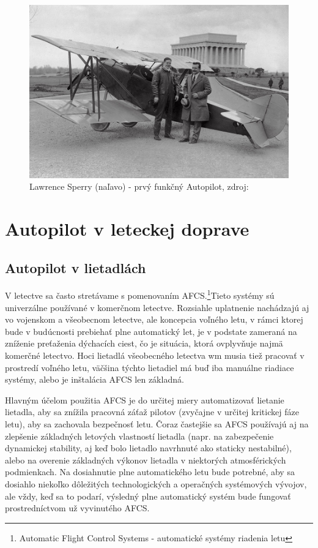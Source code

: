 \documentclass[10pt,twoside,slovak,a4paper]{article}
\begin{document}
\begin{figure}[tbh]
\centering
\includegraphics[scale=0.27]{obr2.jpg}
\caption{Lawrence Sperry (naľavo) - prvý funkčný Autopilot, zdroj:\cite{Sperry}}
\label{f:obr2}
\end{figure}

\section{Autopilot v leteckej doprave} \label{AVL}

\subsection{Autopilot v lietadlách}
V letectve sa často stretávame s pomenovaním AFCS.\footnote{Automatic Flight Control Systems - automatické systémy riadenia letu}Tieto systémy sú univerzálne používané v komerčnom letectve. Rozsiahle uplatnenie nachádzajú aj vo vojenskom a všeobecnom letectve, ale koncepcia voľného letu, v rámci ktorej bude v budúcnosti prebiehať plne automatický let, je v podstate zameraná na zníženie preťaženia dýchacích ciest, čo je situácia, ktorá ovplyvňuje najmä komerčné letectvo. Hoci lietadlá všeobecného letectva wm musia tiež pracovať v prostredí voľného letu, väčšina týchto lietadiel má buď iba manuálne riadiace systémy, alebo je inštalácia AFCS len základná.\cite{JenieAFCS}

Hlavným účelom použitia AFCS je do určitej miery automatizovať lietanie lietadla, aby sa znížila pracovná záťaž pilotov (zvyčajne v určitej kritickej fáze letu), aby sa zachovala bezpečnosť letu. Čoraz častejšie sa AFCS používajú aj na zlepšenie základných letových vlastností lietadla (napr. na zabezpečenie dynamickej stability, aj keď bolo lietadlo navrhnuté ako staticky nestabilné), alebo na overenie základných výkonov lietadla v niektorých atmosférických podmienkach. Na dosiahnutie plne automatického letu bude potrebné, aby sa dosiahlo niekoľko dôležitých technologických a operačných systémových vývojov, ale vždy, keď sa to podarí, výsledný plne automatický systém bude fungovať prostredníctvom už vyvinutého AFCS.\cite{McLeanAFCS}
\end{document}
